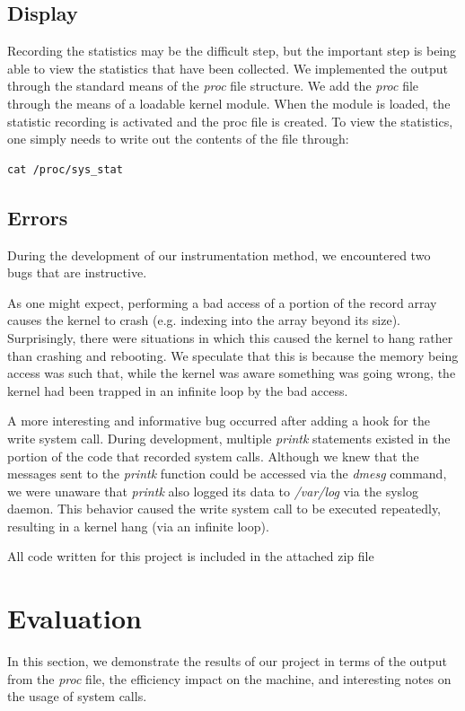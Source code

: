 \documentclass[conference]{IEEEtran}
\begin{document}
\subsection{Display}
Recording the statistics may be the difficult step, but the important step is being able to view the statistics that have been collected.
We implemented the output through the standard means of the \textit{proc} file structure.
We add the \textit{proc} file through the means of a loadable kernel module.
When the module is loaded, the statistic recording is activated and the proc file is created.
To view the statistics, one simply needs to write out the contents of the file through:

\begin{verbatim}
cat /proc/sys_stat
\end{verbatim}

\subsection{Errors}
During the development of our instrumentation method, we encountered two bugs that are instructive.

As one might expect, performing a bad access of a portion of the record array causes the kernel to crash (e.g. indexing into the array beyond its size).
Surprisingly, there were situations in which this caused the kernel to hang rather than crashing and rebooting.
We speculate that this is because the memory being access was such that, while the kernel was aware something was going wrong, the kernel had been trapped in an infinite loop by the bad access.

A more interesting and informative bug occurred after adding a hook for the write system call.
During development, multiple \textit{printk} statements existed in the portion of the code that recorded system calls.
Although we knew that the messages sent to the \textit{printk} function could be accessed via the \textit{dmesg} command, we were unaware that \textit{printk} also logged its data to \textit{/var/log} via the syslog daemon.
This behavior caused the write system call to be executed repeatedly, resulting in a kernel hang (via an infinite loop).

All code written for this project is included in the attached zip file

\section{Evaluation}
\label{sec:evaluation}
In this section, we demonstrate the results of our project in terms of the output from the \textit{proc} file, the efficiency impact on the machine, and interesting notes on the usage of system calls.
\end{document}
